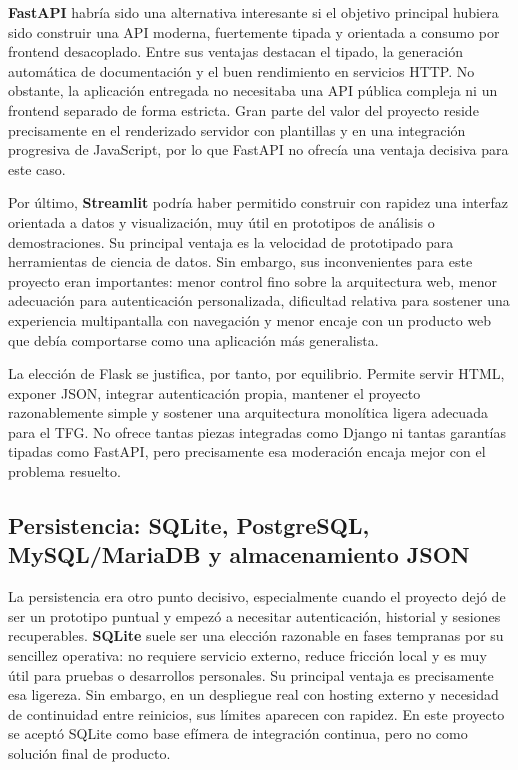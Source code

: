 \textbf{FastAPI} \cite{fastapi} habría sido una alternativa interesante si el objetivo principal hubiera sido construir una API moderna, fuertemente tipada y orientada a consumo por frontend desacoplado. Entre sus ventajas destacan el tipado, la generación automática de documentación y el buen rendimiento en servicios HTTP. No obstante, la aplicación entregada no necesitaba una API pública compleja ni un frontend separado de forma estricta. Gran parte del valor del proyecto reside precisamente en el renderizado servidor con plantillas y en una integración progresiva de JavaScript, por lo que FastAPI no ofrecía una ventaja decisiva para este caso.

Por último, \textbf{Streamlit} \cite{streamlit} podría haber permitido construir con rapidez una interfaz orientada a datos y visualización, muy útil en prototipos de análisis o demostraciones. Su principal ventaja es la velocidad de prototipado para herramientas de ciencia de datos. Sin embargo, sus inconvenientes para este proyecto eran importantes: menor control fino sobre la arquitectura web, menor adecuación para autenticación personalizada, dificultad relativa para sostener una experiencia multipantalla con navegación y menor encaje con un producto web que debía comportarse como una aplicación más generalista.

La elección de Flask se justifica, por tanto, por equilibrio. Permite servir HTML, exponer JSON, integrar autenticación propia, mantener el proyecto razonablemente simple y sostener una arquitectura monolítica ligera adecuada para el TFG. No ofrece tantas piezas integradas como Django ni tantas garantías tipadas como FastAPI, pero precisamente esa moderación encaja mejor con el problema resuelto.

\subsection{Persistencia: SQLite, PostgreSQL, MySQL/MariaDB y almacenamiento JSON}

La persistencia era otro punto decisivo, especialmente cuando el proyecto dejó de ser un prototipo puntual y empezó a necesitar autenticación, historial y sesiones recuperables. \textbf{SQLite} \cite{sqlite} suele ser una elección razonable en fases tempranas por su sencillez operativa: no requiere servicio externo, reduce fricción local y es muy útil para pruebas o desarrollos personales. Su principal ventaja es precisamente esa ligereza. Sin embargo, en un despliegue real con hosting externo y necesidad de continuidad entre reinicios, sus límites aparecen con rapidez. En este proyecto se aceptó SQLite como base efímera de integración continua, pero no como solución final de producto.

